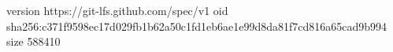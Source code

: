 version https://git-lfs.github.com/spec/v1
oid sha256:c371f9598ec17d029fb1b62a50c1fd1eb6ae1e99d8da81f7cd816a65cad9b994
size 588410
